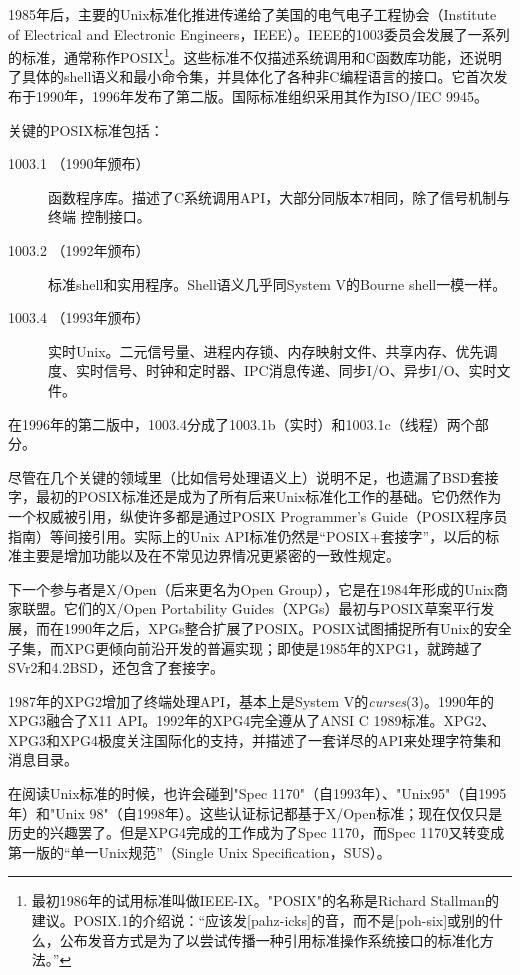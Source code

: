 \documentclass[12pt,oneside]{book}
\begin{document}
\begin{common-format}
1985年后，主要的Unix标准化推进传递给了美国的电气电子工程协会（Institute of Electrical and Electronic Engineers，IEEE）。IEEE的1003委员会发展了一系列的标准，通常称作POSIX\footnote{最初1986年的试用标准叫做IEEE-IX。"POSIX"的名称是Richard Stallman的建议。POSIX.1的介绍说：“应该发[pahz-icks]的音，而不是[poh-six]或别的什么，公布发音方式是为了以尝试传播一种引用标准操作系统接口的标准化方法。”}。这些标准不仅描述系统调用和C函数库功能，还说明了具体的shell语义和最小命令集，并具体化了各种非C编程语言的接口。它首次发布于1990年，1996年发布了第二版。国际标准组织采用其作为ISO/IEC 9945。

关键的POSIX标准包括：
\begin{description}
\item[1003.1 （1990年颁布）] 函数程序库。描述了C系统调用API，大部分同版本7相同，除了信号机制与终端
控制接口。
\item[1003.2 （1992年颁布）] 标准shell和实用程序。Shell语义几乎同System V的Bourne shell一模一样。
\item[1003.4 （1993年颁布）] 实时Unix。二元信号量、进程内存锁、内存映射文件、共享内存、优先调度、实时信号、时钟和定时器、IPC消息传递、同步I/O、异步I/O、实时文件。
\end{description}

在1996年的第二版中，1003.4分成了1003.1b（实时）和1003.1c（线程）两个部分。

尽管在几个关键的领域里（比如信号处理语义上）说明不足，也遗漏了BSD套接字，最初的POSIX标准还是成为了所有后来Unix标准化工作的基础。它仍然作为一个权威被引用，纵使许多都是通过POSIX Programmer's Guide（POSIX程序员指南）\cite{Lewine}等间接引用。实际上的Unix API标准仍然是“POSIX+套接字”，以后的标准主要是增加功能以及在不常见边界情况更紧密的一致性规定。

下一个参与者是X/Open（后来更名为Open Group），它是在1984年形成的Unix商家联盟。它们的X/Open Portability Guides（XPGs）最初与POSIX草案平行发展，而在1990年之后，XPGs整合扩展了POSIX。POSIX试图捕捉所有Unix的安全子集，而XPG更倾向前沿开发的普遍实现；即使是1985年的XPG1，就跨越了SVr2和4.2BSD，还包含了套接字。

1987年的XPG2增加了终端处理API，基本上是System V的\textit{curses}(3)。1990年的XPG3融合了X11 API。1992年的XPG4完全遵从了ANSI C 1989标准。XPG2、XPG3和XPG4极度关注国际化的支持，并描述了一套详尽的API来处理字符集和消息目录。

在阅读Unix标准的时候，也许会碰到"Spec 1170"（自1993年）、"Unix95"（自1995年）和"Unix 98"（自1998年）。这些认证标记都基于X/Open标准；现在仅仅只是历史的兴趣罢了。但是XPG4完成的工作成为了Spec 1170，而Spec 1170又转变成第一版的“单一Unix规范”（Single Unix Specification，SUS）。


\end{common-format}
\end{document}
